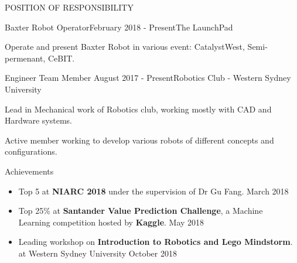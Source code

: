 \documentclass{resume} %
\begin{document}

 
  
\begin{rSection}{POSITION OF RESPONSIBILITY}

\begin{rSubsection}{Baxter Robot Operator}{February 2018 - Present}{The LaunchPad}{}              
\item Operate and present Baxter Robot in various event: CatalystWest, Semi-permenant, CeBIT.
\end{rSubsection}  


\begin{rSubsection}{Engineer Team Member} {August 2017 - Present}{Robotics Club - Western Sydney University}{} 
\item Lead in Mechanical work of Robotics club, working mostly with CAD and Hardware systems.
\item Active member working to develop various robots of different concepts and configurations.    
\end{rSubsection}

\end{rSection}
  


\begin{rSection}{Achievements} \itemsep -2pt   

\begin{itemize}
 
\item \faTrophy \hspace{0.1cm} Top 5 at \textbf{NIARC 2018} under the supervision of Dr Gu Fang. \hfill March 2018 
\item \faTrophy \hspace{0.1cm} Top 25\% at \textbf{Santander Value Prediction Challenge}, a Machine
\\Learning competition hosted by \textbf{Kaggle}.   \hfill May 2018  
\item Leading workshop on \textbf{Introduction to Robotics and Lego Mindstorm}.
\\at Western Sydney University \hfill October 2018 
  
\end{itemize}  


\end{rSection} 

\end{document}
